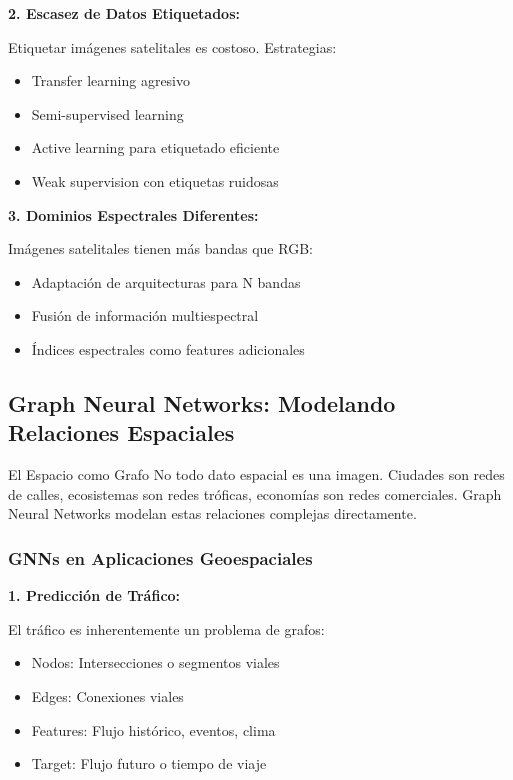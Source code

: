 \documentclass[12pt,a4paper]{article}
\begin{document}
\textbf{2. Escasez de Datos Etiquetados:}

Etiquetar imágenes satelitales es costoso. Estrategias:
\begin{itemize}
    \item Transfer learning agresivo
    \item Semi-supervised learning
    \item Active learning para etiquetado eficiente
    \item Weak supervision con etiquetas ruidosas
\end{itemize}

\textbf{3. Dominios Espectrales Diferentes:}

Imágenes satelitales tienen más bandas que RGB:
\begin{itemize}
    \item Adaptación de arquitecturas para N bandas
    \item Fusión de información multiespectral
    \item Índices espectrales como features adicionales
\end{itemize}

\subsection{Graph Neural Networks: Modelando Relaciones Espaciales}

\begin{conceptbox}{El Espacio como Grafo}
No todo dato espacial es una imagen. Ciudades son redes de calles, ecosistemas son redes tróficas, economías son redes comerciales. Graph Neural Networks modelan estas relaciones complejas directamente.
\end{conceptbox}

\subsubsection{GNNs en Aplicaciones Geoespaciales}

\textbf{1. Predicción de Tráfico:}

El tráfico es inherentemente un problema de grafos:
\begin{itemize}
    \item Nodos: Intersecciones o segmentos viales
    \item Edges: Conexiones viales
    \item Features: Flujo histórico, eventos, clima
    \item Target: Flujo futuro o tiempo de viaje
\end{itemize}
\end{document}
